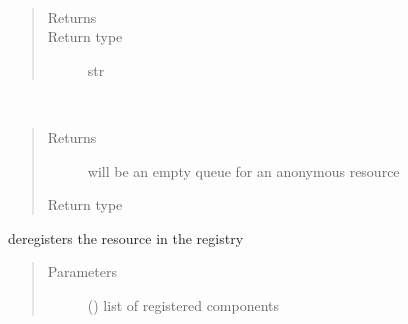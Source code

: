 \documentclass[letterpaper,10pt,english]{sphinxmanual}
\begin{document}
\begin{fulllineitems}
\begin{quote}
\begin{description}
\end{description}\end{quote}

\begin{fulllineitems}
\label{\detokenize{Reference:salabim.Resource.base_name}}~\begin{quote}\begin{description}
\item[{Returns}] \leavevmode
{}

\item[{Return type}] \leavevmode
str

\end{description}\end{quote}

\end{fulllineitems}


\begin{fulllineitems}
\label{\detokenize{Reference:salabim.Resource.claimers}}~\begin{quote}\begin{description}
\item[{Returns}] \leavevmode
{} \textendash{} will be an empty queue for an anonymous resource

\item[{Return type}] \leavevmode
{\hyperref[\detokenize{Reference:salabim.Queue}]{}}

\end{description}\end{quote}

\end{fulllineitems}


\begin{fulllineitems}
\label{\detokenize{Reference:salabim.Resource.deregister}}
deregisters the resource in the registry
\begin{quote}\begin{description}
\item[{Parameters}] \leavevmode
{} () \textendash{} list of registered components


\end{description}
\end{quote}
\end{fulllineitems}
\end{fulllineitems}
\end{document}
